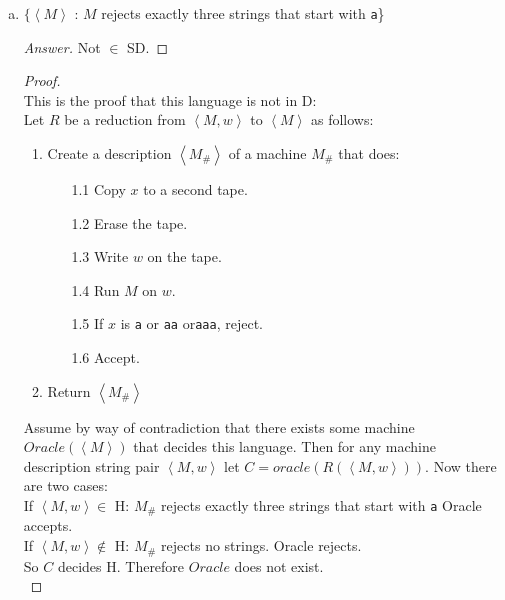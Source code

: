 \documentclass[10pt]{article}
\newcommand{\brackets}[1]{\left< #1 \right>}
\begin{document}
\begin{enumerate}[1)]
\begin{enumerate}[a)]
\begin{proof}[Proof]
So $C$ decides $\lnot$ H.  Therefore $Oracle$ does not exist.
\end{proof}

\pagebreak
\item
$\{\brackets{M}$ : $M$ rejects exactly three strings that start with \texttt{a}\}
\begin{proof}[Answer]
Not $\in$ SD.
\end{proof}
\begin{proof}[Proof]$ $\\
This is the proof that this language is not in D:\\

Let $R$ be a reduction from $\brackets{M, w}$ to $\brackets{M}$ as follows:
\begin{enumerate}[1.]
\item
Create a description $\brackets{M_\#}$ of a machine $M_\#$ that does:
\begin{enumerate}
\item[1.1]
Copy $x$ to a second tape.

\item[1.2]
Erase the tape.

\item[1.3]
Write $w$ on the tape.

\item[1.4]
Run $M$ on $w$.

\item[1.5]
If $x$ is \texttt{a} or \texttt{aa} or\texttt{aaa}, reject.

\item[1.6]
Accept.
\end{enumerate}
\item
Return $\brackets{M_\#}$
\end{enumerate}

Assume by way of contradiction that there exists some machine $Oracle(\brackets{M})$ that decides this language.  Then for any machine description string pair $\brackets{M, w}$ let $C = oracle(R(\brackets{M, w}))$. Now there are two cases:\\

If $\brackets{M, w} \in$ H: $M_\#$ rejects exactly three strings that start with \texttt{a}  Oracle accepts.\\
If $\brackets{M, w} \not \in$ H: $M_\#$ rejects no strings.  Oracle rejects.\\

So $C$ decides H.  Therefore $Oracle$ does not exist.\\


\end{proof}
\end{enumerate}
\end{enumerate}
\end{document}
